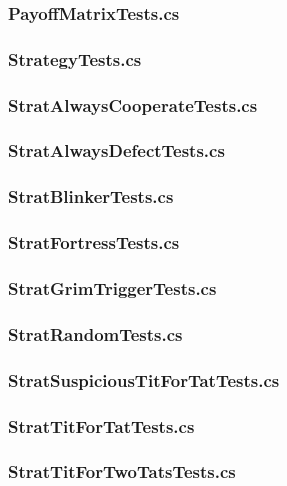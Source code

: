 \documentclass[a4paper, french]{article}
\begin{document}
\subsubsection{PayoffMatrixTests.cs}


\subsubsection{StrategyTests.cs}


\subsubsection{StratAlwaysCooperateTests.cs}


\subsubsection{StratAlwaysDefectTests.cs}


\subsubsection{StratBlinkerTests.cs}


\subsubsection{StratFortressTests.cs}


\subsubsection{StratGrimTriggerTests.cs}


\subsubsection{StratRandomTests.cs}


\subsubsection{StratSuspiciousTitForTatTests.cs}


\subsubsection{StratTitForTatTests.cs}


\subsubsection{StratTitForTwoTatsTests.cs}

\end{document}
